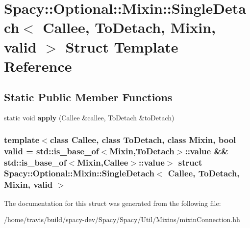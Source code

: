 \hypertarget{structSpacy_1_1Optional_1_1Mixin_1_1SingleDetach}{\section{\-Spacy\-:\-:\-Optional\-:\-:\-Mixin\-:\-:\-Single\-Detach$<$ \-Callee, \-To\-Detach, \-Mixin, valid $>$ \-Struct \-Template \-Reference}
\label{structSpacy_1_1Optional_1_1Mixin_1_1SingleDetach}
}
\subsection*{\-Static \-Public \-Member \-Functions}
\begin{DoxyCompactItemize}
\item 
\hypertarget{structSpacy_1_1Optional_1_1Mixin_1_1SingleDetach_a19a3ca88e4fd73c4c489104add58aba2}{static void {\bfseries apply} (\-Callee \&callee, \-To\-Detach \&to\-Detach)}\label{structSpacy_1_1Optional_1_1Mixin_1_1SingleDetach_a19a3ca88e4fd73c4c489104add58aba2}

\end{DoxyCompactItemize}
\subsubsection*{template$<$class Callee, class To\-Detach, class Mixin, bool valid = std\-::is\-\_\-base\-\_\-of$<$\-Mixin,\-To\-Detach$>$\-::value \&\& std\-::is\-\_\-base\-\_\-of$<$\-Mixin,\-Callee$>$\-::value$>$ struct Spacy\-::\-Optional\-::\-Mixin\-::\-Single\-Detach$<$ Callee, To\-Detach, Mixin, valid $>$}



\-The documentation for this struct was generated from the following file\-:\begin{DoxyCompactItemize}
\item 
/home/travis/build/spacy-\/dev/\-Spacy/\-Spacy/\-Util/\-Mixins/mixin\-Connection.\-hh\end{DoxyCompactItemize}
